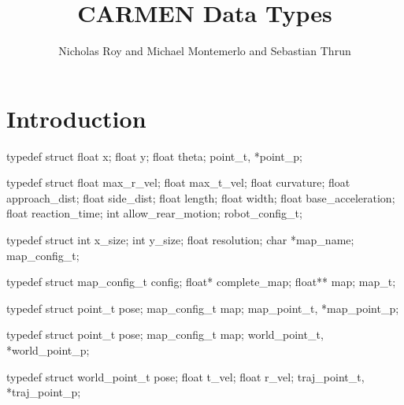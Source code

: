 \documentclass{article}
\title{CARMEN Data Types}
\author{Nicholas Roy and Michael Montemerlo and Sebastian Thrun}
\begin{document}
\maketitle

\section{Introduction}

typedef struct {
  float x;
  float y;
  float theta;
} point_t, *point_p;

typedef struct {
  float max_r_vel;
  float max_t_vel;
  float curvature;
  float approach_dist;
  float side_dist;
  float length;
  float width;
  float base_acceleration;
  float reaction_time;
  int allow_rear_motion;
} robot_config_t;

typedef struct {
  int x_size;
  int y_size;
  float resolution;
  char *map_name;
} map_config_t;

typedef struct {
  map_config_t config;
  float* complete_map;
  float** map;
} map_t;

typedef struct {
  point_t pose;
  map_config_t map;
} map_point_t, *map_point_p;

typedef struct {
  point_t pose;
  map_config_t map;
} world_point_t, *world_point_p;

typedef struct {
  world_point_t pose;
  float t_vel;
  float r_vel;
} traj_point_t, *traj_point_p;
\end{document}
